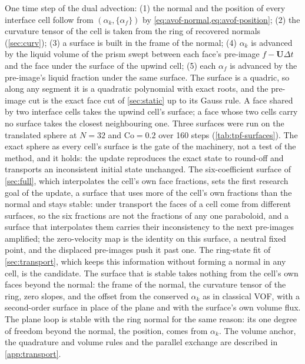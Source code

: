 \documentclass[preprint,12pt]{elsarticle}
\begin{document}
One time step of the dual advection: (1) the normal and the position of every interface cell follow from $(\alpha_k, \{\alpha_f\})$ by \cref{eq:avof-normal,eq:avof-position}; (2) the curvature tensor of the cell is taken from the ring of recovered normals (\cref{sec:curv}); (3) a surface is built in the frame of the normal; (4) $\alpha_k$ is advanced by the liquid volume of the prism swept between each face's pre-image $f - \mathbf{U}\Delta t$ and the face under the surface of the upwind cell; (5) each $\alpha_f$ is advanced by the pre-image's liquid fraction under the same surface. The surface is a quadric, so along any segment it is a quadratic polynomial with exact roots, and the pre-image cut is the exact face cut of \cref{sec:static} up to its Gauss rule. A face shared by two interface cells takes the upwind cell's surface; a face whose two cells carry no surface takes the closest neighbouring one. Three surfaces were run on the translated sphere at $N = 32$ and $\mathrm{Co} = 0.2$ over 160 steps (\cref{tab:tpf-surfaces}). The exact sphere as every cell's surface is the gate of the machinery, not a test of the method, and it holds: the update reproduces the exact state to round-off and transports an inconsistent initial state unchanged. The six-coefficient surface of \cref{sec:full}, which interpolates the cell's own face fractions, sets the first research goal of the update, a surface that uses more of the cell's own fractions than the normal and stays stable: under transport the faces of a cell come from different surfaces, so the six fractions are not the fractions of any one paraboloid, and a surface that interpolates them carries their inconsistency to the next pre-images amplified; the zero-velocity map is the identity on this surface, a neutral fixed point, and the displaced pre-images push it past one. The ring-state fit of \cref{sec:transport}, which keeps this information without forming a normal in any cell, is the candidate. The surface that is stable takes nothing from the cell's own faces beyond the normal: the frame of the normal, the curvature tensor of the ring, zero slopes, and the offset from the conserved $\alpha_k$ as in classical VOF, with a second-order surface in place of the plane and with the surface's own volume flux. The plane loop is stable with the ring normal for the same reason: its one degree of freedom beyond the normal, the position, comes from $\alpha_k$. The volume anchor, the quadrature and volume rules and the parallel exchange are described in \ref{app:transport}.
\end{document}
